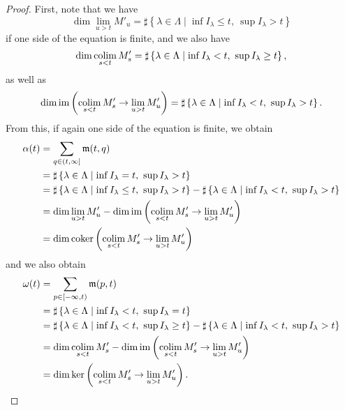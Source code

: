 \begin{proof}
	First, note that we have
	\[
		 \dim \lim_{u > t} M'_{u}
		 = \sharp \left\{ \lambda \in \Lambda \mid \inf I_{\lambda} \leq t,\ \sup I_{\lambda} > t \right\}
	\]
	if one side of the equation is finite, and we also have
	\[
		 \dim \operatorname*{colim}_{s < t} M'_{s}
		 = \sharp \left\{ \lambda \in \Lambda \mid \inf I_{\lambda} < t,\ \sup I_{\lambda} \geq t \right\},
	\]
	as well as
	\[
	    \dim \operatorname{im} \left( \operatorname*{colim}_{s < t} M'_{s} \to \lim_{u > t} M'_{u} \right)
	    = \sharp \left\{ \lambda \in \Lambda \mid \inf I_{\lambda} < t,\ \sup I_{\lambda} > t \right\}.
	\]
	From this, if again one side of the equation is finite, we obtain
	\begin{align*}
	    \alpha(t) &= \sum_{q \in (t, \infty]} \mathfrak{m}(t,q) \\
	              &= \sharp \left\{ \lambda \in \Lambda \mid \inf I_{\lambda} = t,\ \sup I_{\lambda} > t \right\} \\
	              &= \sharp \left\{ \lambda \in \Lambda \mid \inf I_{\lambda} \leq t,\ \sup I_{\lambda} > t \right\}
	              -  \sharp \left\{ \lambda \in \Lambda \mid \inf I_{\lambda} < t,\ \sup I_{\lambda} > t \right\} \\
	              &= \dim \lim_{u > t} M'_{u} - \dim \operatorname{im} \left( \operatorname*{colim}_{s < t} M'_{s} \to \lim_{u > t} M'_{u} \right) \\
	              &= \dim \operatorname{coker} \left( \operatorname*{colim}_{s < t} M'_{s} \to \lim_{u > t} M'_{u} \right)
	\end{align*}
	and we also obtain
	\begin{align*}
	    \omega(t) &= \sum_{p \in [-\infty, t)} \mathfrak{m}(p,t) \\
	              &= \sharp \left\{ \lambda \in \Lambda \mid \inf I_{\lambda} < t,\ \sup I_{\lambda} = t \right\} \\
	              &= \sharp \left\{ \lambda \in \Lambda \mid \inf I_{\lambda} < t,\ \sup I_{\lambda} \geq t \right\}
	              -  \sharp \left\{ \lambda \in \Lambda \mid \inf I_{\lambda} < t,\ \sup I_{\lambda} > t \right\} \\
	              &= \dim \operatorname*{colim}_{s < t} M'_{s} - \dim \operatorname{im} \left( \operatorname*{colim}_{s < t} M'_{s} \to \lim_{u > t} M'_{u} \right) \\
	              &= \dim \ker \left( \operatorname*{colim}_{s < t} M'_{s} \to \lim_{u > t} M'_{u} \right).
	              \qedhere
	\end{align*}
\end{proof}

